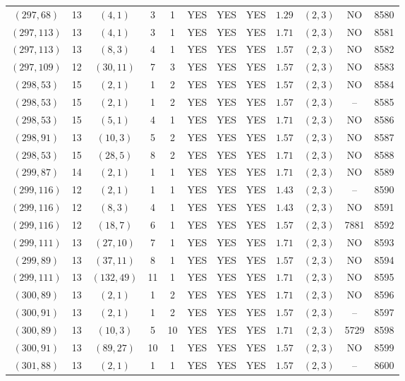 \begin{longtable}{|c|c|c|c|c|c|c|c|c|c|c|c|}
$(297,68)$ & 13 & $(4,1)$ & 3 & 1 & YES & YES & YES & $1.29$ & $(2,3)$ & NO & 8580\\
$(297,113)$ & 13 & $(4,1)$ & 3 & 1 & YES & YES & YES & $1.71$ & $(2,3)$ & NO & 8581\\
$(297,113)$ & 13 & $(8,3)$ & 4 & 1 & YES & YES & YES & $1.57$ & $(2,3)$ & NO & 8582\\
$(297,109)$ & 12 & $(30,11)$ & 7 & 3 & YES & YES & YES & $1.57$ & $(2,3)$ & NO & 8583\\
$(298,53)$ & 15 & $(2,1)$ & 1 & 2 & YES & YES & YES & $1.57$ & $(2,3)$ & NO & 8584\\
$(298,53)$ & 15 & $(2,1)$ & 1 & 2 & YES & YES & YES & $1.57$ & $(2,3)$ & -- & 8585\\
$(298,53)$ & 15 & $(5,1)$ & 4 & 1 & YES & YES & YES & $1.71$ & $(2,3)$ & NO & 8586\\
$(298,91)$ & 13 & $(10,3)$ & 5 & 2 & YES & YES & YES & $1.57$ & $(2,3)$ & NO & 8587\\
$(298,53)$ & 15 & $(28,5)$ & 8 & 2 & YES & YES & YES & $1.71$ & $(2,3)$ & NO & 8588\\
$(299,87)$ & 14 & $(2,1)$ & 1 & 1 & YES & YES & YES & $1.71$ & $(2,3)$ & NO & 8589\\
$(299,116)$ & 12 & $(2,1)$ & 1 & 1 & YES & YES & YES & $1.43$ & $(2,3)$ & -- & 8590\\
$(299,116)$ & 12 & $(8,3)$ & 4 & 1 & YES & YES & YES & $1.43$ & $(2,3)$ & NO & 8591\\
$(299,116)$ & 12 & $(18,7)$ & 6 & 1 & YES & YES & YES & $1.57$ & $(2,3)$ & 7881 & 8592\\
$(299,111)$ & 13 & $(27,10)$ & 7 & 1 & YES & YES & YES & $1.71$ & $(2,3)$ & NO & 8593\\
$(299,89)$ & 13 & $(37,11)$ & 8 & 1 & YES & YES & YES & $1.57$ & $(2,3)$ & NO & 8594\\
$(299,111)$ & 13 & $(132,49)$ & 11 & 1 & YES & YES & YES & $1.71$ & $(2,3)$ & NO & 8595\\
$(300,89)$ & 13 & $(2,1)$ & 1 & 2 & YES & YES & YES & $1.71$ & $(2,3)$ & NO & 8596\\
$(300,91)$ & 13 & $(2,1)$ & 1 & 2 & YES & YES & YES & $1.57$ & $(2,3)$ & -- & 8597\\
$(300,89)$ & 13 & $(10,3)$ & 5 & 10 & YES & YES & YES & $1.71$ & $(2,3)$ & 5729 & 8598\\
$(300,91)$ & 13 & $(89,27)$ & 10 & 1 & YES & YES & YES & $1.57$ & $(2,3)$ & NO & 8599\\
$(301,88)$ & 13 & $(2,1)$ & 1 & 1 & YES & YES & YES & $1.57$ & $(2,3)$ & -- & 8600\\

\end{longtable}
